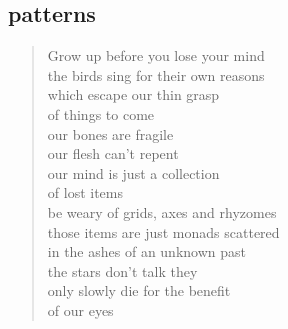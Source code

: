\documentclass[11pt]{article}
\begin{document}
\subsection{patterns}
\label{sec:org3f18754}
\begin{verse}
Grow up before you lose your mind\\
the birds sing for their own reasons\\
which escape our thin grasp\\
of things to come\\
our bones are fragile\\
our flesh can't repent\\
our mind is just a collection\\
of lost items\\
be weary of grids, axes and rhyzomes\\
those items are just monads scattered\\
in the ashes of an unknown past\\
the stars don't talk they\\
only slowly die for the benefit\\
of our eyes\\
\end{verse}
\end{document}
